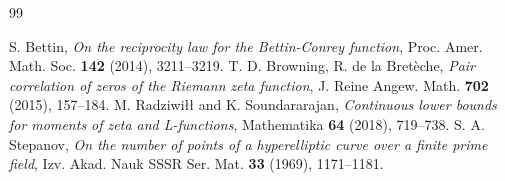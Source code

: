 \documentclass[11pt,a4paper]{article}
\theoremstyle{definition}
\begin{document}
\begin{thebibliography}{99}

 S. Bettin, \emph{On the reciprocity law for the Bettin-Conrey function}, Proc. Amer. Math. Soc. \textbf{142} (2014), 3211--3219.
 T. D. Browning, R. de la Bret\`eche, \emph{Pair correlation of zeros of the Riemann zeta function}, J. Reine Angew. Math. \textbf{702} (2015), 157--184.
 M. Radziwi\l\l{} and K. Soundararajan, \emph{Continuous lower bounds for moments of zeta and L-functions}, Mathematika \textbf{64} (2018), 719--738.
 S. A. Stepanov, \emph{On the number of points of a hyperelliptic curve over a finite prime field}, Izv. Akad. Nauk SSSR Ser. Mat. \textbf{33} (1969), 1171--1181.

\end{thebibliography}
\end{document}
